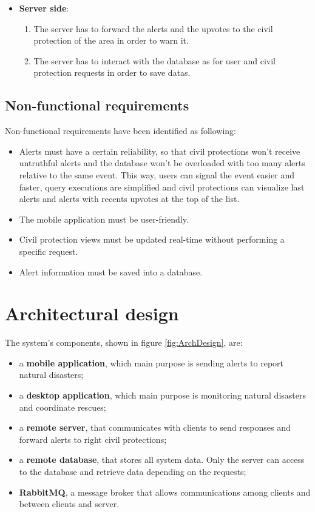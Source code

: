 \documentclass[a4paper,12pt]{report}
\begin{document}
\begin{itemize}
\item \textbf{Server side}:
\begin{enumerate}
\item The server has to forward the alerts and the upvotes to the civil protection of the area in order to warn it.
\item The server has to interact with the database as for user and civil protection requests in order to save datas. 
\end{enumerate}
\end{itemize}

\section{Non-functional requirements}
Non-functional requirements have been identified as following:

\begin{itemize}
\item Alerts must have a certain reliability, so that civil protections won't receive untruthful alerts and the database won't be overloaded with too many alerts relative to the same event. This way, users can signal the event easier and faster, query executions are simplified and civil protections can visualize last alerts and alerts with recents upvotes at the top of the list.
\item The mobile application must be user-friendly.
\item Civil protection views must be updated real-time without performing a specific request.
\item Alert information must be saved into a database.
\end{itemize}

\chapter{Architectural design}

The system's components, shown in figure \ref{fig:ArchDesign}, are:

\begin{itemize}
\item a \textbf{mobile application}, which main purpose is sending alerts to report natural disasters;
\item a \textbf{desktop application}, which main purpose is monitoring natural disasters and coordinate rescues;
\item a \textbf{remote server}, that communicates with clients to send responses and forward alerts to right civil protections;
\item a \textbf{remote database}, that stores all system data. Only the server can access to the database and retrieve data depending on the requests;
\item \textbf{RabbitMQ}, a message broker that allows communications among clients and between clients and server.
\end{itemize}
\end{document}
